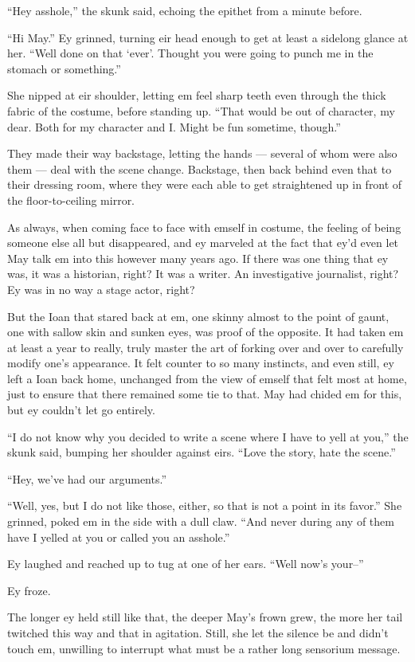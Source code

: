 ``Hey asshole,'' the skunk said, echoing the epithet from a minute before.

``Hi May.'' Ey grinned, turning eir head enough to get at least a sidelong glance at her. ``Well done on that `ever'. Thought you were going to punch me in the stomach or something.''

She nipped at eir shoulder, letting em feel sharp teeth even through the thick fabric of the costume, before standing up. ``That would be out of character, my dear. Both for my character and I. Might be fun sometime, though.''

They made their way backstage, letting the hands — several of whom were also them — deal with the scene change. Backstage, then back behind even that to their dressing room, where they were each able to get straightened up in front of the floor-to-ceiling mirror.

As always, when coming face to face with emself in costume, the feeling of being someone else all but disappeared, and ey marveled at the fact that ey'd even let May talk em into this however many years ago. If there was one thing that ey was, it was a historian, right? It was a writer. An investigative journalist, right? Ey was in no way a stage actor, right?

But the Ioan that stared back at em, one skinny almost to the point of gaunt, one with sallow skin and sunken eyes, was proof of the opposite. It had taken em at least a year to really, truly master the art of forking over and over to carefully modify one's appearance. It felt counter to so many instincts, and even still, ey left a Ioan back home, unchanged from the view of emself that felt most at home, just to ensure that there remained some tie to that. May had chided em for this, but ey couldn't let go entirely.

``I do not know why you decided to write a scene where I have to yell at you,'' the skunk said, bumping her shoulder against eirs. ``Love the story, hate the scene.''

``Hey, we've had our arguments.''

``Well, yes, but I do not like those, either, so that is not a point in its favor.'' She grinned, poked em in the side with a dull claw. ``And never during any of them have I yelled at you or called you an asshole.''

Ey laughed and reached up to tug at one of her ears. ``Well now's your--''

Ey froze.

The longer ey held still like that, the deeper May's frown grew, the more her tail twitched this way and that in agitation. Still, she let the silence be and didn't touch em, unwilling to interrupt what must be a rather long sensorium message.

